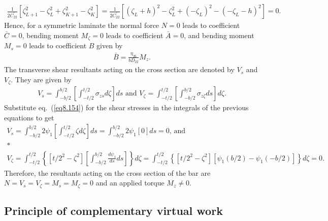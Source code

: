 \documentclass{AeroStructure-ERJohnson}
\begin{document}
\begin{align}\label{eq8.164}
\frac{1}{2
C_{22}^{\prime}}\left[\zeta_{L+1}^{2}-\zeta_{L}^{2}+\zeta_{K+1}^{2}-\zeta_{K}^{2}\right]=\frac{1}{2
C_{22}^{\prime}}\left[\left(\zeta_{L}+h\right)^{2}-\zeta_{L}^{2}+\left(-\zeta_{L}\right)^{2}-\left(-\zeta_{L}-h\right)^{2}\right]=0.
\end{align}
\noindent Hence, for a symmetric laminate the normal force $N=0$ leads to
coefficient $\bar{C}=0$, bending moment $M_{\zeta}=0$ leads to
coefficient $\bar{A}=0$, and bending moment $M_{s}=0$ leads to
coefficient $B$ given by
\begin{align}\label{eq8.165}
\bar{B}=\frac{\eta_{26}}{b D_{22}} M_{z}.
\end{align}
The transverse shear resultants acting on the cross section are
denoted by $V_{s}$ and $V_{\zeta}$. They are given by
\begin{align}\label{eq8.166}
V_{s}=\int_{-b/ 2}^{b/2}\left[\int_{-t/ 2}^{t/ 2} \sigma_{z
s} d \zeta\right] d s\mbox{ and }V_{\zeta}=\int_{-t/ 2}^{t/
2}\left[\int_{-b/ 2}^{b/ 2} \sigma_{z \zeta} d s\right] d \zeta.
\end{align}
Substitute eq.~(\ref{eq8.154}) for the shear stresses in the
integrals of the previous equations to get
\begin{gather}
V_{s}=\int_{-b/ 2}^{b/ 2} 2 \psi_{1}\left[\int_{-t/ 2}^{t/ 2}
\zeta d \zeta\right] d s=\int_{-b/ 2}^{b/ 2} 2 \psi_{1}[0] d
s=0\mbox{, and }\label{eq8.167}\\*
\nonumber\\
V_{\zeta}=\int_{-t/ 2}^{t/ 2}\left\{\left[t/
2^{2}-\zeta^{2}\right]\left[\int_{-b/ 2}^{b/ 2} \frac{d
\psi_{1}}{d s} d s\right]\right\} d \zeta=\int_{-t/ 2}^{t/
2}\left\{\left[t/ 2^{2}-\zeta^{2}\right]\left[\psi_{1}(b/
2)-\psi_{1}(-b/ 2)\right]\right\} d \zeta=0.\label{eq8.168}
\end{gather}
Therefore, the resultants acting on the cross section of the bar
are $N=V_{s}=V_{\zeta}=M_{s}=M_{\zeta}=0$ and an applied torque
$M_{z} \neq 0$.

\subsection{Principle of complementary virtual work}\label{sec8.4.4}
\end{document}
